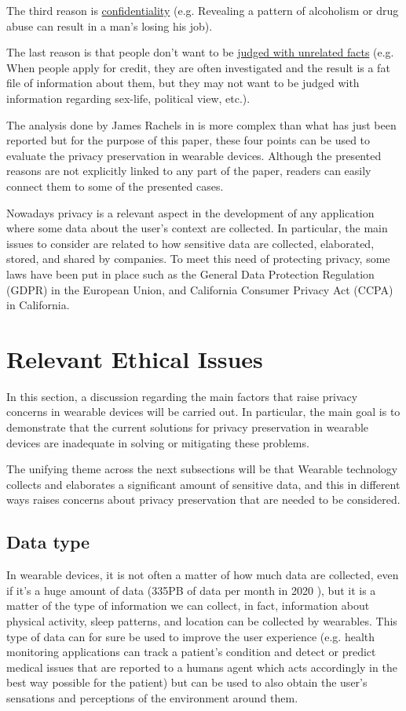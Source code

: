 \documentclass{article}
\begin{document}
The third reason is \ul{confidentiality} (e.g. Revealing a pattern of alcoholism or drug abuse can result in a man's losing his job).

The last reason is that people don’t want to be \ul{judged with unrelated facts} (e.g. When people apply for credit, they are often investigated and the result is a fat file of information about them, but they may not want to be judged with information regarding sex-life, political view, etc.). 

The analysis done by James Rachels in \cite{rachels_why_1975} is more complex than what has just been reported but for the purpose of this paper, these four points can be used to evaluate the privacy preservation in wearable devices. Although the presented reasons are not explicitly linked to any part of the paper, readers can easily connect them to some of the presented cases.
 
Nowadays privacy is a relevant aspect in the development of any application where some data about the user’s context are collected. In particular, the main issues to consider are related to how sensitive data are collected, elaborated, stored, and shared by companies. To meet this need of protecting privacy, some laws have been put in place such as the General Data Protection Regulation (GDPR) in the European Union, and California Consumer Privacy Act (CCPA) in California.

\section{Relevant Ethical Issues}
In this section, a discussion regarding the main factors that raise privacy concerns in wearable devices will be carried out. In particular, the main goal is to demonstrate that the current solutions for privacy preservation in wearable devices are inadequate in solving or mitigating these problems.

The unifying theme across the next subsections will be that Wearable technology collects and elaborates a significant amount of sensitive data, and this in different ways raises concerns about privacy preservation that are needed to be considered.

\subsection{Data type}
In  wearable devices, it is not often a matter of how much data are collected, even if it’s a huge amount of data (335PB of data per month in 2020 \cite{noauthor_storage_nodate}), but it is a matter of the type of information we can collect, in fact, information about physical activity, sleep patterns, and location can be collected by wearables. This type of data can for sure be used to improve the user experience (e.g. health monitoring applications can track a patient’s condition and detect or predict medical issues that are reported to a humans agent which acts accordingly in the best way possible for the patient) but can be used to also obtain the user’s sensations and perceptions of the environment around them. 
\end{document}
